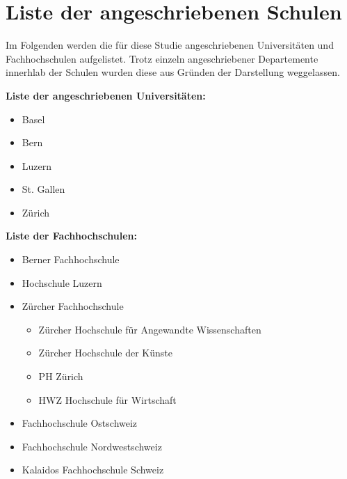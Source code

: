 \section{Liste der angeschriebenen Schulen}\label{chap.appendix_schulListe}

Im Folgenden werden die für diese Studie angeschriebenen Universitäten und Fachhochschulen aufgelistet. Trotz einzeln angeschriebener Departemente innerhlab der Schulen wurden diese aus Gründen der Darstellung weggelassen.\par

\textbf{Liste der angeschriebenen Universitäten:}
\begin{itemize}
    \item Basel
    \item Bern
    \item Luzern
    \item St. Gallen
    \item Zürich
\end{itemize}
\textbf{Liste der Fachhochschulen:}
\begin{itemize}
    \item Berner Fachhochschule
    \item Hochschule Luzern
    \item Zürcher Fachhochschule
    \begin{itemize}
        \item Zürcher Hochschule für Angewandte Wissenschaften
        \item Zürcher Hochschule der Künste
        \item PH Zürich
        \item HWZ Hochschule für Wirtschaft
    \end{itemize}
    \item Fachhochschule Ostschweiz
    \item Fachhochschule Nordwestschweiz 
    \item Kalaidos Fachhochschule Schweiz
\end{itemize}

